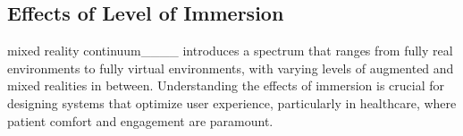 

\subsection{Effects of Level of Immersion}

 mixed reality continuum____ introduces a spectrum that ranges from fully real environments to fully virtual environments, with varying levels of augmented and mixed realities in between. Understanding the effects of immersion is crucial for designing systems that optimize user experience, particularly in healthcare, where patient comfort and engagement are paramount.

